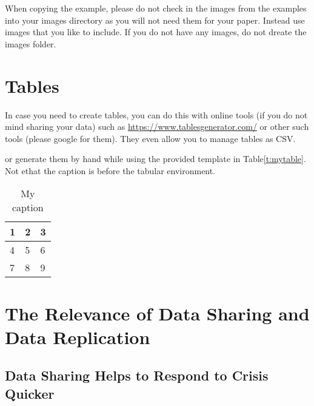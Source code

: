 \documentclass[sigconf]{acmart}
\begin{document}
When copying the example, please do not check in the images from the
examples into your images directory as you will not need them for your
paper. Instead use images that you like to include. If you do not have
any images, do not dreate the images folder.

\section{Tables}

In case you need to create tables, you can do this with online tools
(if you do not mind sharing your data) such as
\url{https://www.tablesgenerator.com/} or other such tools (please
google for them). They even allow you to manage tables as CSV.

or generate them by hand while using the provided template in Table\ref{t:mytable}. Not ethat
the caption is before the tabular environment.

\begin{table}[htb]
\centering
\caption{My caption}
\label{t:mytabble}
\begin{tabular}{lll}
1 & 2 & 3 \\
\hline
4 & 5 & 6 \\
7 & 8 & 9
\end{tabular}
\end{table}

\section{The Relevance of Data Sharing and Data Replication }

\subsection{Data Sharing Helps to Respond to Crisis Quicker}
\end{document}
